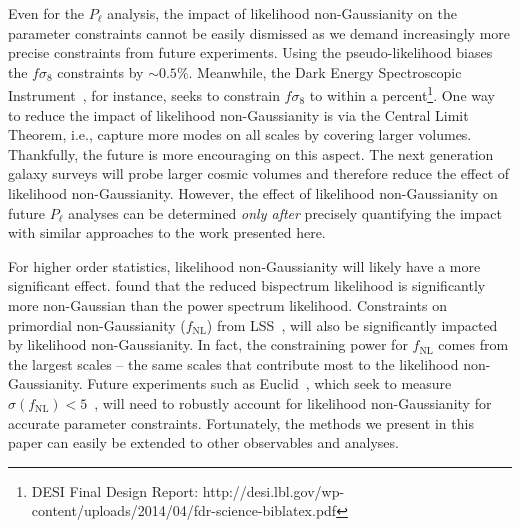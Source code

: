 \documentclass[12pt, letterpaper, preprint]{aastex}
\newcommand{\lss}{{\small{LSS}}\xspace}
\begin{document}
Even for the $P_\ell$ analysis, the impact of likelihood non-Gaussianity 
on the parameter constraints cannot be easily dismissed as we demand 
increasingly more precise constraints from future experiments. Using the 
pseudo-likelihood biases the $f\sigma_8$ constraints by $\sim 0.5\%$. 
Meanwhile, the Dark Energy Spectroscopic Instrument~\citep[DESI;][]{levi2013}, 
for instance, seeks to constrain $f\sigma_8$ to within a 
percent\footnote{DESI Final Design Report: http://desi.lbl.gov/wp-content/uploads/2014/04/fdr-science-biblatex.pdf}. 
One way to reduce the impact of likelihood non-Gaussianity is via the Central
Limit Theorem, i.e., capture more modes on all scales by covering larger volumes. Thankfully, the future
is more encouraging on this aspect. 
The next generation galaxy surveys will probe larger cosmic volumes and
therefore reduce the effect of likelihood non-Gaussianity.  
However, the effect of likelihood non-Gaussianity on future $P_\ell$
analyses can be determined {\em  only after} precisely quantifying the impact
with similar approaches to the work presented here.


For higher order statistics, likelihood non-Gaussianity will likely 
have a more significant effect. \cite{scoccimarro2000}   
found that the reduced bispectrum likelihood is significantly more 
non-Gaussian than the power spectrum likelihood. Constraints on primordial 
non-Gaussianity ($f_\mathrm{NL}$) from \lss~\citep[\emph{e.g.}][]{dalal2008, slosar2008, ross2013, giannantonio2014}, 
will also be significantly impacted by likelihood non-Gaussianity. 
In fact, the constraining power for $f_\mathrm{NL}$ comes from the 
largest scales -- the same scales that contribute most to the likelihood non-Gaussianity. 
Future experiments such as Euclid~\citep{amendola2016}, which seek 
to measure $\sigma(f_\mathrm{NL}) < 5$~\citep{giannantonio2012, amendola2016}, 
will need to robustly account for likelihood non-Gaussianity for 
accurate parameter constraints. Fortunately, the methods we present 
in this paper can easily be extended to other observables and analyses. 
\end{document}
